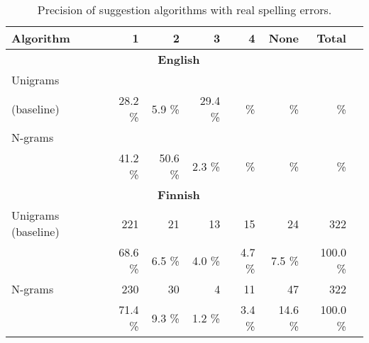 \documentclass{llncs}
\begin{document}
\begin{table*}
    \caption{Precision of suggestion algorithms with real spelling errors.
    \label{table:real-eval}}
  \begin{center}
      \begin{tabular}{lrrrrrrr}
        \hline
        Algorithm & 1 & 2 & 3 & 4 & None & Total \\
        \hline
        \multicolumn{7}{c}{\textbf{English}} \\
        \hline
        Unigrams 
&    &   &    &   &   &     \\
        (baseline) 
& 28.2 \% & 5.9 \% & 29.4 \% &     \% &     \%  &       \% \\
        \hline
        N-grams 
&       &       &      &      &       &     \\
& 41.2 \% & 50.6 \% & 2.3 \% &     \% &      \% &       \% \\
\hline
        \multicolumn{7}{c}{\textbf{Finnish}} \\
        \hline
        Unigrams  
        (baseline) 
& 221    & 21    & 13    & 15    & 24    & 322 \\
& 68.6 \% & 6.5 \% & 4.0 \% & 4.7 \% & 7.5 \% & 100.0 \% \\

        \hline
        N-grams
& 230    & 30    & 4    & 11    & 47    & 322 \\
& 71.4 \% & 9.3 \% & 1.2 \% & 3.4 \% & 14.6 \% & 100.0 \% \\
        \hline
      \end{tabular}
  \end{center}
\end{table*}
\end{document}
